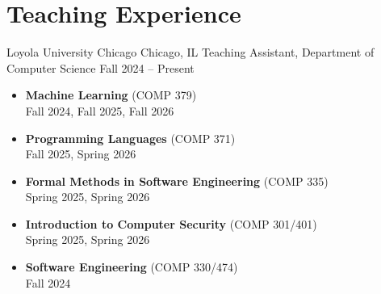\section*{Teaching Experience}

\cventry
    {Loyola University Chicago}
    {Chicago, IL}
    {Teaching Assistant, Department of Computer Science}
    {Fall 2024 -- Present}

\begin{itemize}
    \item \textbf{Machine Learning} (COMP 379)\\
        Fall 2024, Fall 2025, Fall 2026

    \item \textbf{Programming Languages} (COMP 371)\\
        Fall 2025, Spring 2026

    \item \textbf{Formal Methods in Software Engineering}
        (COMP 335)\\
        Spring 2025, Spring 2026

    \item \textbf{Introduction to Computer Security}
        (COMP 301/401)\\
        Spring 2025, Spring 2026

    \item \textbf{Software Engineering} (COMP 330/474)\\
        Fall 2024
\end{itemize}